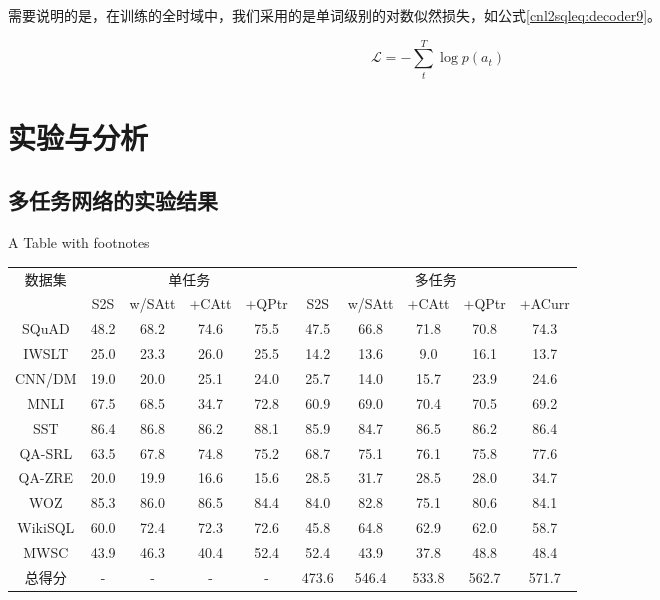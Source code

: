 需要说明的是，在训练的全时域中，我们采用的是单词级别的对数似然损失，如公式\ref{cnl2sqleq:decoder9}。

\begin{equation}
  \label{cnl2sqleq:decoder9}
  \mathcal L = -\sum^T_t \log p(a_t)
\end{equation}


\section{实验与分析}
\label{cnl2sql:syyfx}
\subsection{多任务网络的实验结果}

\begin{table}[!htpb]
    {A Table with footnotes}
  \label{tab:drwwldsyjg}
  \centering
  \begin{threeparttable}[b]
     \begin{tabular}{cccccccccc}
      \toprule
      \multirow{2}{18mm}{数据集}&\multicolumn{4}{c}{单任务} & \multicolumn{5}{c}{多任务}\\
      \cmidrule(lr){2-5}\cmidrule(lr){6-10}
      & S2S & w/SAtt & +CAtt & +QPtr & S2S & w/SAtt & +CAtt & +QPtr & +ACurr\\
      \midrule
      SQuAD & 48.2 & 68.2 & 74.6 & 75.5 & 47.5 & 66.8 & 71.8 & 70.8 & 74.3\\
      IWSLT & 25.0 & 23.3 & 26.0 & 25.5 & 14.2 & 13.6 & 9.0 & 16.1 & 13.7\\
      CNN/DM & 19.0 & 20.0 & 25.1 & 24.0 & 25.7 & 14.0 & 15.7 & 23.9 & 24.6\\
      MNLI & 67.5 & 68.5 & 34.7 & 72.8 & 60.9 & 69.0 & 70.4 & 70.5 & 69.2\\
      SST & 86.4 & 86.8 & 86.2 & 88.1 & 85.9 & 84.7 & 86.5 & 86.2 & 86.4\\
      QA-SRL & 63.5 & 67.8 & 74.8 & 75.2 & 68.7 & 75.1 & 76.1 & 75.8 & 77.6\\
      QA-ZRE & 20.0 & 19.9 & 16.6 & 15.6 & 28.5 & 31.7 & 28.5 & 28.0 & 34.7\\
      WOZ & 85.3 & 86.0 & 86.5 & 84.4 & 84.0 & 82.8 & 75.1 & 80.6 & 84.1\\
      WikiSQL & 60.0 & 72.4 & 72.3 & 72.6 & 45.8 & 64.8 & 62.9 & 62.0 & 58.7\\
      MWSC & 43.9 & 46.3 & 40.4 & 52.4 & 52.4 & 43.9 & 37.8 & 48.8 & 48.4\\
      \midrule
      总得分 & - & - & - & - & 473.6 & 546.4 & 533.8 & 562.7 & 571.7\\
      \bottomrule
    \end{tabular}
  \end{threeparttable}
\end{table}

